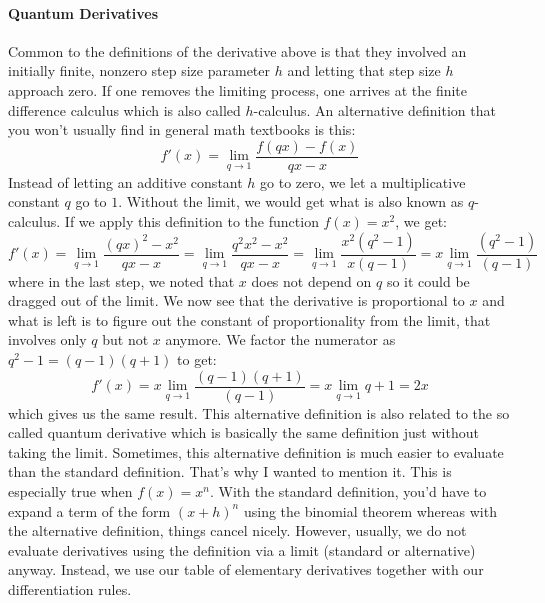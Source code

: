 \paragraph{Quantum Derivatives}
Common to the definitions of the derivative above is that they involved an initially finite, nonzero step size parameter $h$ and letting that step size $h$ approach zero. If one removes the limiting process, one arrives at the finite difference calculus which is also called $h$-calculus. An alternative definition that you won't usually find in general math textbooks is this:
\begin{equation}
 f'(x) = \lim_{q \rightarrow 1} \frac{f(q x) - f(x)}{ q x - x }
\end{equation}
Instead of letting an additive constant $h$ go to zero, we let a multiplicative constant $q$ go to $1$. Without the limit, we would get what is also known as $q$-calculus. If we apply this definition to the function $f(x) = x^2$, we get:
\begin{equation}
f'(x) = \lim_{q \rightarrow 1} \frac{(q x)^2 - x^2}{ q x - x }
      = \lim_{q \rightarrow 1} \frac{q^2 x^2 - x^2}{ q x - x }
      = \lim_{q \rightarrow 1} \frac{x^2 (q^2 - 1)}{ x (q - 1)}
      = x \lim_{q \rightarrow 1} \frac{(q^2 - 1)}{(q - 1)}         
\end{equation}
where in the last step, we noted that $x$ does not depend on $q$ so it could be dragged out of the limit. We now see that the derivative is proportional to $x$ and what is left is to figure out the constant of proportionality from the limit, that involves only $q$ but not $x$ anymore. We factor the numerator as $q^2 - 1 = (q-1)(q+1)$ to get:
\begin{equation}
f'(x) = x \lim_{q \rightarrow 1} \frac{(q-1)(q+1)}{(q - 1)}     
      = x \lim_{q \rightarrow 1} q+1
      = 2 x
\end{equation}
which gives us the same result. This alternative definition is also related to the so called quantum derivative which is basically the same definition just without taking the limit. Sometimes, this alternative definition is much easier to evaluate than the standard definition. That's why I wanted to mention it. This is especially true when $f(x) = x^n$. With the standard definition, you'd have to expand a term of the form $(x+h)^n$ using the binomial theorem whereas with the alternative definition, things cancel nicely. However, usually, we do not evaluate derivatives using the definition via a limit (standard or alternative) anyway. Instead, we use our table of elementary derivatives together with our differentiation rules.

